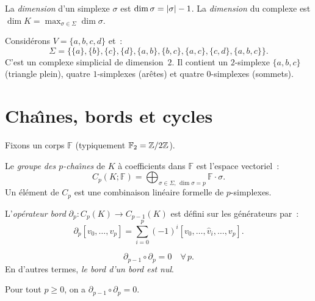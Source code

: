 \begin{definition}[Dimension]
La \emph{dimension} d'un simplexe $\sigma$ est $\dim \sigma = \left| \sigma \right| - 1$.
La \emph{dimension} du complexe est $\dim K = \max_{\sigma \in \Sigma} \dim \sigma$.
\end{definition}

\begin{exemple}
Consid\'erons $V = \{a, b, c, d\}$ et~:
\[
  \Sigma = \big\{
    \{a\}, \{b\}, \{c\}, \{d\},
    \{a,b\}, \{b,c\}, \{a,c\}, \{c,d\},
    \{a,b,c\}
  \big\}.
\]
C'est un complexe simplicial de dimension~$2$. Il contient un
$2$-simplexe $\{a,b,c\}$ (triangle plein), quatre $1$-simplexes
(ar\^etes) et quatre $0$-simplexes (sommets).
\end{exemple}

\section{Cha\^{\i}nes, bords et cycles}

Fixons un corps $\mathbb{F}$ (typiquement $\mathbb{F}_2 = \mathbb{Z} / 2\mathbb{Z}$).

\begin{definition}
Le \emph{groupe des $p$-cha\^{\i}nes} de $K$ \`a coefficients dans
$\mathbb{F}$ est l'espace vectoriel~:
\[
  C_p(K; \mathbb{F}) = \bigoplus_{\sigma \in \Sigma,\, \dim \sigma = p}
  \mathbb{F} \cdot \sigma.
\]
Un \'el\'ement de $C_p$ est une combinaison lin\'eaire formelle de
$p$-simplexes.
\end{definition}

\begin{definition}
L'\emph{op\'erateur bord} $\partial_p : C_p(K) \to C_{p-1}(K)$ est
d\'efini sur les g\'en\'erateurs par~:
\[
  \partial_p [v_0, \ldots, v_p]
  = \sum_{i=0}^{p} (-1)^i [v_0, \ldots, \hat{v}_i, \ldots, v_p].
\]
\end{definition}

\begin{formules}[title=\textbf{Propri\'et\'e fondamentale du bord}]
\[
  \partial_{p-1} \circ \partial_p = 0 \quad \forall\, p.
\]
En d'autres termes, \emph{le bord d'un bord est nul}.
\end{formules}

\begin{proposition}
Pour tout $p \geq 0$, on a $\partial_{p-1} \circ \partial_p = 0$.
\end{proposition}

